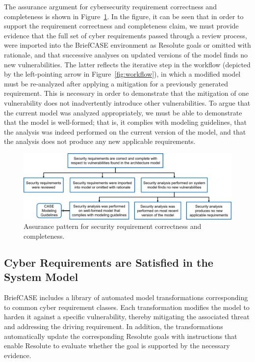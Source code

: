 The assurance argument for cybersecurity requirement correctness and completeness is shown in Figure~\ref{fig:req-correct-complete}.  
%
In the figure, it can be seen that in order to support the requirement correctness and completeness claim, we must provide evidence that the full set of cyber requirements passed through a review process, were imported into the BriefCASE environment as Resolute goals or omitted with rationale, and that successive analyses on updated versions of the model finds no new vulnerabilities.  The latter reflects the iterative step in the workflow (depicted by the left-pointing arrow in Figure~\ref{fig:workflow}), in which a modified model must be re-analyzed after applying a mitigation for a previously generated requirement.  This is necessary in order to demonstrate that the mitigation of one vulnerability does not inadvertently introduce other vulnerabilities.  To argue that the current model was analyzed appropriately, we must be able to demonstrate that the model is well-formed; that is, it complies with modeling guidelines, that the analysis was indeed performed on the current version of the model, and that the analysis does not produce any new applicable requirements.

\begin{figure}[h] 
	\centering 
	\includegraphics[width=\textwidth]{figs/req-correct-complete.png}
	\caption{Assurance pattern for security requirement correctness and completeness.}
	\label{fig:req-correct-complete} 
\end{figure}

\subsection{Cyber Requirements are Satisfied in the System Model}
BriefCASE includes a library of automated model transformations corresponding to common cyber requirement classes.  Each transformation modifies the model to harden it against a specific vulnerability, thereby mitigating the associated threat and addressing the driving requirement.  In addition, the transformations automatically update the corresponding Resolute goals with instructions that enable Resolute to evaluate whether the goal is supported by the necessary evidence.

